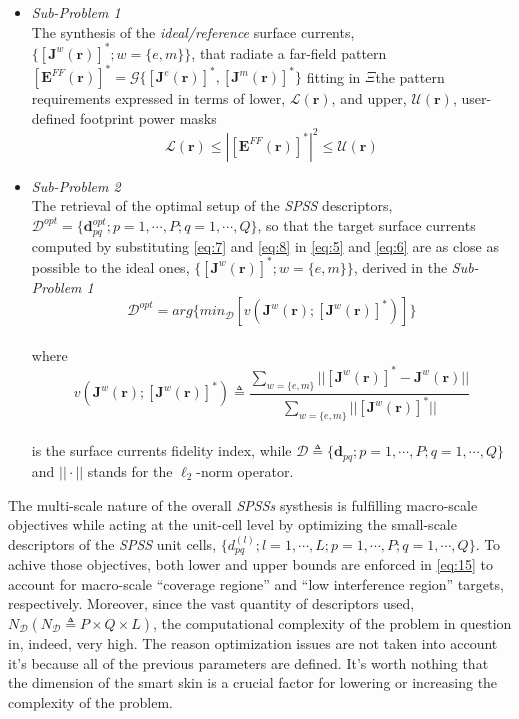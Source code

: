 \begin{itemize}
\item \emph{Sub-Problem 1}\\
The synthesis of the \emph{ideal/reference} surface currents, $\{[\mathbf{J}^{w}(\mathbf{r})]^{*};w=\{ e,m\}\}$,
that radiate a far-field pattern $[\mathbf{E}^{FF}(\mathbf{r})]^{*}=\mathcal{G}\{[\mathbf{J}^{e}(\mathbf{r})]^{*},[\mathbf{J}^{m}(\mathbf{r})]^{*}\}$
fitting in $\Xi$the pattern requirements expressed in terms of lower,
$\mathcal{L}(\mathbf{r})$, and upper, $\mathcal{U}(\mathbf{r})$,
user-defined footprint power masks \begin{equation}
\mathcal{L}(\mathbf{r})\leq|[\mathbf{E}^{FF}(\mathbf{r})]^{*}|^{2}\leq\mathcal{U}(\mathbf{r})\label{eq:15}\end{equation}

\item \emph{Sub-Problem 2}\\
The retrieval of the optimal setup of the \emph{SPSS} descriptors,
$\mathcal{D}^{opt}=\{\mathbf{d}_{pq}^{opt};p=1,\cdots,P;q=1,\cdots,Q\}$,
so that the target surface currents computed by substituting \ref{eq:7}
and \ref{eq:8} in \ref{eq:5} and \ref{eq:6} are as close as possible
to the ideal ones, $\{[\mathbf{J}^{w}(\mathbf{r})]^{*};w=\{ e,m\}\}$,
derived in the \emph{Sub-Problem 1}\begin{equation}
\mathcal{D}^{opt}=arg\{ min_{\mathcal{D}}[v(\mathbf{J}^{w}(\mathbf{r});[\mathbf{J}^{w}(\mathbf{r})]^{*})]\}\label{eq:16}\end{equation}
\\
where\begin{equation}
v(\mathbf{J}^{w}(\mathbf{r});[\mathbf{J}^{w}(\mathbf{r})]^{*})\triangleq\frac{\sum_{w=\{ e,m\}}||[\mathbf{J}^{w}(\mathbf{r})]^{*}-\mathbf{J}^{w}(\mathbf{r})||}{\sum_{w=\{ e,m\}}||[\mathbf{J}^{w}(\mathbf{r})]^{*}||}\label{eq:17}\end{equation}
\\
is the surface currents fidelity index, while $\mathcal{D}\triangleq\{\mathbf{d}_{pq};p=1,\cdots,P;q=1,\cdots,Q\}$
and $||\cdot||$ stands for the $\ell_{2}$-norm operator.
\end{itemize}
The multi-scale nature of the overall \emph{SPSSs} systhesis is fulfilling
macro-scale objectives while acting at the unit-cell level by optimizing
the small-scale descriptors of the \emph{SPSS} unit cells, $\{ d_{pq}^{(l)};l=1,\cdots,L;p=1,\cdots,P;q=1,\cdots,Q\}$.
To achive those objectives, both lower and upper bounds are enforced
in \ref{eq:15} to account for macro-scale {}``coverage regione''
and {}``low interference region'' targets, respectively. Moreover,
since the vast quantity of descriptors used, $N_{\mathcal{D}}(N_{\mathcal{D}}\triangleq P\times Q\times L)$,
the computational complexity of the problem in question in, indeed,
very high. The reason optimization issues are not taken into account
it's because all of the previous parameters are defined. It's worth
nothing that the dimension of the smart skin is a crucial factor for
lowering or increasing the complexity of the problem. \emph{}


